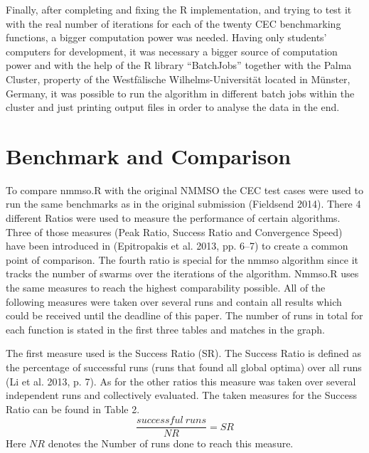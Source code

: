 \documentclass[12pt,a4paper]{article}
\begin{document}
Finally, after completing and fixing the R implementation, and trying to
test it with the real number of iterations for each of the twenty CEC
benchmarking functions, a bigger computation power was needed. Having
only students' computers for development, it was necessary a bigger
source of computation power and with the help of the R library
``BatchJobs'' together with the Palma Cluster, property of the
Westfälische Wilhelms-Universität located in Münster, Germany, it was
possible to run the algorithm in different batch jobs within the cluster
and just printing output files in order to analyse the data in the end.

\section{Benchmark and Comparison}\label{benchmark-and-comparison}

To compare nmmso.R with the original NMMSO the CEC test cases were used
to run the same benchmarks as in the original submission (Fieldsend
2014). There 4 different Ratios were used to measure the performance of
certain algorithms. Three of those measures (Peak Ratio, Success Ratio
and Convergence Speed) have been introduced in (Epitropakis et al. 2013,
pp. 6--7) to create a common point of comparison. The fourth ratio is
special for the nmmso algorithm since it tracks the number of swarms
over the iterations of the algorithm. Nmmso.R uses the same measures to
reach the highest comparability possible. All of the following measures
were taken over several runs and contain all results which could be
received until the deadline of this paper. The number of runs in total
for each function is stated in the first three tables and matches in the
graph.

The first measure used is the Success Ratio (SR). The Success Ratio is
defined as the percentage of successful runs (runs that found all global
optima) over all runs (Li et al. 2013, p. 7). As for the other ratios
this measure was taken over several independent runs and collectively
evaluated. The taken measures for the Success Ratio can be found in
Table 2. \[\frac{successful\ runs}{NR} = SR \] Here \(NR\) denotes the
Number of runs done to reach this measure. \newline
\end{document}
